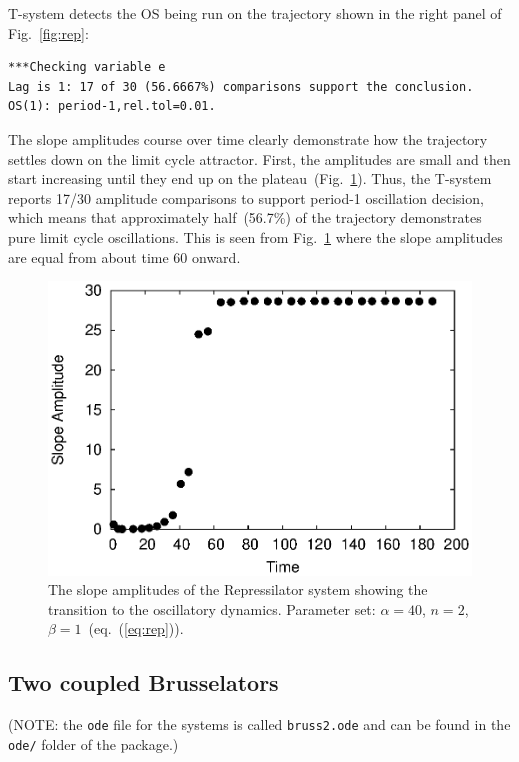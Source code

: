 \documentclass[11pt,a4paper]{article}
\begin{document}
T-system detects the OS being run on the trajectory shown in the right panel of
Fig.~\ref{fig:rep}:
\begin{verbatim}
***Checking variable e
Lag is 1: 17 of 30 (56.6667%) comparisons support the conclusion.
OS(1): period-1,rel.tol=0.01.
\end{verbatim}

The slope amplitudes course over time clearly demonstrate how the trajectory settles
down on the limit cycle attractor. First, the amplitudes are small and then start
increasing until they end up on the plateau~(Fig.~\ref{fig:rep_samp}). Thus, the
T-system reports 17/30 amplitude comparisons to support period-1 oscillation
decision, which means that approximately half~(56.7\%) of the trajectory demonstrates
pure limit cycle oscillations. This is seen from Fig.~\ref{fig:rep_samp} where the
slope amplitudes are equal from about time 60 onward.

\begin{figure}[h]
  \centering
  \includegraphics[scale=0.7]{rep_samp}
  \caption{The slope amplitudes of the Repressilator system showing the transition to
    the oscillatory dynamics. Parameter set: $\alpha=40$, $n=2$,
    $\beta=1$~(eq.~(\ref{eq:rep})).}
  \label{fig:rep_samp}
\end{figure}

\subsection{Two coupled Brusselators}
\label{sec:two-coupl-bruss}

(NOTE: the \texttt{ode} file for the systems is called \texttt{bruss2.ode} and can be
found in the \texttt{ode/} folder of the package.)
\end{document}
